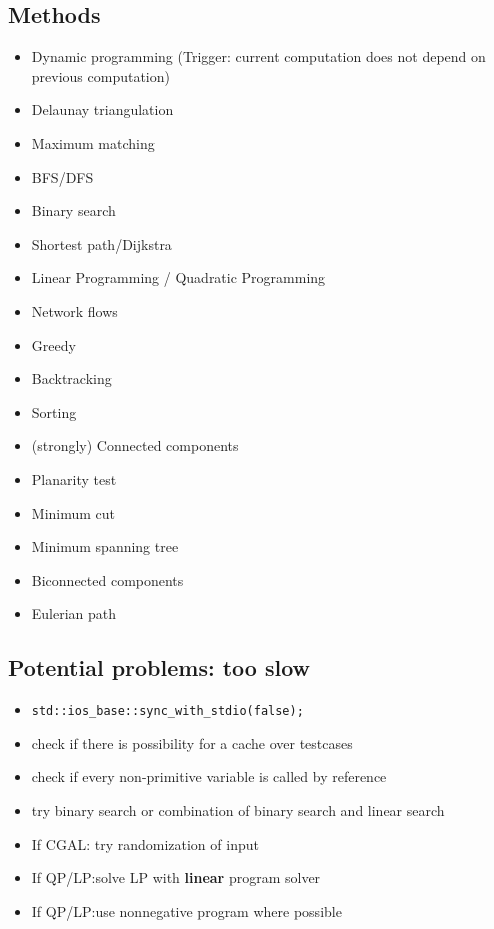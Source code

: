 \documentclass[a4paper, 10pt]{article}
\begin{document}
        \subsection*{Methods}
            \begin{itemize}
                \item Dynamic programming (Trigger: current computation does not depend on previous computation)
                \item Delaunay triangulation
                \item Maximum matching
                \item BFS/DFS
                \item Binary search
                \item Shortest path/Dijkstra
                \item Linear Programming / Quadratic Programming
                \item Network flows
                \item Greedy
                \item Backtracking
                \item Sorting
                \item (strongly) Connected components
                \item Planarity test 
                \item Minimum cut
                \item Minimum spanning tree
                \item Biconnected components 
                \item Eulerian path
            \end{itemize}


        \subsection*{Potential problems: too slow}
            \begin{itemize}
                \item \texttt{std::ios\_base::sync\_with\_stdio(false);}
                \item check if there is possibility for a cache over testcases
                \item check if every non-primitive variable is called by reference
                \item try binary search or combination of binary search and linear search
                \item If CGAL: try randomization of input
                \item If QP/LP:solve LP with \textbf{linear} program solver
                \item If QP/LP:use nonnegative program where possible
            \end{itemize}
\end{document}
